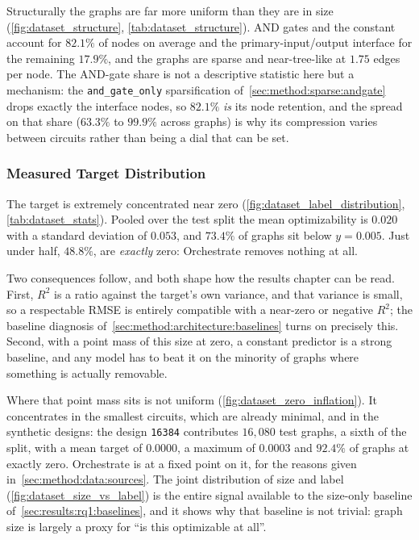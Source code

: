 Structurally the graphs are far more uniform than they are in size
(\ref{fig:dataset_structure}, \ref{tab:dataset_structure}). AND gates and the constant
account for $82.1\%$ of nodes on average and the primary-input/output interface for the
remaining $17.9\%$, and the graphs are sparse and near-tree-like at $1.75$ edges per node.
The AND-gate share is not a descriptive statistic here but a mechanism: the
\texttt{and\_gate\_only} sparsification of~\ref{sec:method:sparse:andgate} drops exactly the
interface nodes, so $82.1\%$ \emph{is} its node retention, and the spread on that share
($63.3\%$ to $99.9\%$ across graphs) is why its compression varies between circuits rather
than being a dial that can be set.

\subsubsection{Measured Target Distribution}
\label{sec:method:data:statistics:label}
The target is extremely concentrated near zero
(\ref{fig:dataset_label_distribution}, \ref{tab:dataset_stats}). Pooled over the test split
the mean optimizability is $0.020$ with a standard deviation of $0.053$, and $73.4\%$ of
graphs sit below $y = 0.005$. Just under half, $48.8\%$, are \emph{exactly} zero: Orchestrate
removes nothing at all.

Two consequences follow, and both shape how the results chapter can be read. First, $R^2$ is
a ratio against the target's own variance, and that variance is small, so a respectable RMSE
is entirely compatible with a near-zero or negative $R^2$; the baseline diagnosis
of~\ref{sec:method:architecture:baselines} turns on precisely this. Second, with a point mass
of this size at zero, a constant predictor is a strong baseline, and any model has to beat it
on the minority of graphs where something is actually removable.

Where that point mass sits is not uniform (\ref{fig:dataset_zero_inflation}). It concentrates
in the smallest circuits, which are already minimal, and in the synthetic designs: the design
\texttt{16384} contributes $16{,}080$ test graphs, a sixth of the split, with a mean
target of $0.0000$, a maximum of $0.0003$ and $92.4\%$ of graphs at exactly zero. Orchestrate
is at a fixed point on it, for the reasons given
in~\ref{sec:method:data:sources}. The joint distribution of size and label
(\ref{fig:dataset_size_vs_label}) is the entire signal available to the size-only baseline
of~\ref{sec:results:rq1:baselines}, and it shows why that baseline is not trivial: graph size
is largely a proxy for ``is this optimizable at all''.

